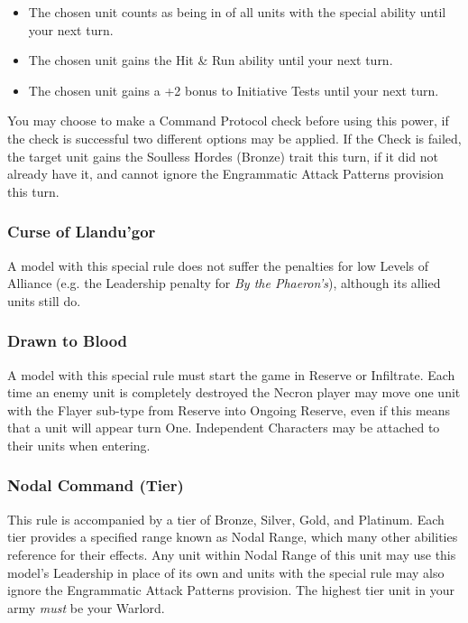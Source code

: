 \begin{multicols}{2}
\begin{itemize}
	\itemsep 0pt
	\item The chosen unit counts as being in  of all units with the  special ability until your next turn.
	\item The chosen unit gains the Hit \& Run ability until your next turn.
	\item The chosen unit gains a +2 bonus to Initiative Tests until your next turn.
\end{itemize}

You may choose to make a Command Protocol check before using this power, if the check is successful two different options may be applied. If the Check is failed, the target unit gains the Soulless Hordes (Bronze) trait this turn, if it did not already have it, and cannot ignore the Engrammatic Attack Patterns provision this turn.

\subsubsection{Curse of Llandu'gor} \label{Curse of Llandu'gor}

A model with this special rule does not suffer the penalties for low Levels of Alliance (e.g. the Leadership penalty for \textit{By the Phaeron's}), although its allied units still do.

\subsubsection{Drawn to Blood} \label{Drawn to Blood}

A model with this special rule must start the game in Reserve or Infiltrate. Each time an enemy unit is completely destroyed the Necron player may move one unit with the Flayer sub-type from Reserve into Ongoing Reserve, even if this means that a unit will appear turn One. Independent Characters may be attached to their units when entering.

\subsubsection{Nodal Command (Tier)} \label{Nodal Command}

This rule is accompanied by a tier of Bronze, Silver, Gold, and Platinum. Each tier provides a specified range known as Nodal Range, which many other abilities reference for their effects. Any unit within Nodal Range of this unit may use this model's Leadership in place of its own and units with the  special rule may also ignore the Engrammatic Attack Patterns provision. The highest tier unit in your army \textit{must} be your Warlord.


\end{multicols}
